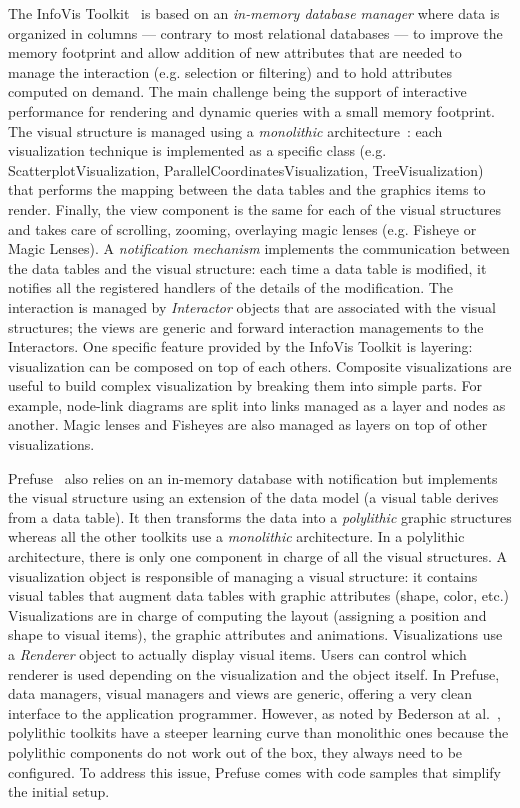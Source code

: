 The InfoVis Toolkit~\cite{InfoVis} is based on an \emph{in-memory
  database manager} where data is organized in columns --- contrary to
most relational databases --- to improve the memory footprint and
allow addition of new attributes that are needed to manage the interaction
(e.g. selection or filtering) and to hold attributes computed on
demand.  The main challenge being the support of interactive
performance for rendering and dynamic queries with a small memory
footprint.  The visual structure is managed using a \emph{monolithic}
architecture~\cite{Polylithic}: each visualization technique is
implemented as a specific class (e.g. ScatterplotVisualization,
ParallelCoordinatesVisualization, TreeVisualization) that performs the
mapping between the data tables and the graphics items to render.
Finally, the view component is the same for each of the visual
structures and takes care of scrolling, zooming, overlaying magic
lenses (e.g. Fisheye or Magic Lenses).   A \emph{notification mechanism}
implements the communication between the data tables and the visual
structure: each time a data table is modified, it notifies all the
registered handlers of the details of the modification. The
interaction is managed by \emph{Interactor} objects that are
associated with the visual structures; the views are generic and
forward interaction managements to the Interactors.  One specific
feature provided by the InfoVis Toolkit is layering: visualization can
be composed on top of each others.  Composite visualizations are
useful to build complex visualization by breaking them into simple
parts. For example, node-link diagrams are split into links managed as
a layer and nodes as another.  Magic lenses and Fisheyes are also
managed as layers on top of other visualizations.

Prefuse~\cite{Prefuse} also relies on an in-memory database with
notification but implements the visual structure using an extension of
the data model (a visual table derives from a data table).  It then
transforms the data into a \emph{polylithic} graphic structures
whereas all the other toolkits use a \emph{monolithic} architecture.
In a polylithic architecture, there is only one component in charge of
all the visual structures.  A visualization object is responsible of
managing a visual structure: it contains visual tables that augment
data tables with graphic attributes (shape, color, etc.)
Visualizations are in charge of computing the layout (assigning a
position and shape to visual items), the graphic attributes and
animations.  Visualizations use a \emph{Renderer} object to actually
display visual items.  Users can control which renderer is used
depending on the visualization and the object itself.  In Prefuse,
data managers, visual managers and views are generic, offering a very
clean interface to the application programmer.  However, as noted by
Bederson at al.~\cite{Polylithic}, polylithic toolkits have a steeper
learning curve than monolithic ones because the polylithic components
do not work out of the box, they always need to be configured.  To
address this issue, Prefuse comes with code samples that simplify the
initial setup.

